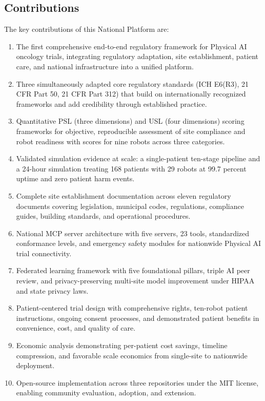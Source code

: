 \subsection{Contributions}
\label{subsec:contributions}

The key contributions of this National Platform are:

\begin{enumerate}[nosep]
  \item The first comprehensive end-to-end regulatory framework for Physical AI
    oncology trials, integrating regulatory adaptation, site establishment,
    patient care, and national infrastructure into a unified platform.
  \item Three simultaneously adapted core regulatory standards (ICH E6(R3),
    21 CFR Part 50, 21 CFR Part 312) that build on internationally recognized
    frameworks and add credibility through established practice.
  \item Quantitative PSL (three dimensions) and USL (four dimensions) scoring
    frameworks for objective, reproducible assessment of site compliance and
    robot readiness with scores for nine robots across three categories.
  \item Validated simulation evidence at scale: a single-patient ten-stage
    pipeline and a 24-hour simulation treating 168 patients with 29 robots at
    99.7 percent uptime and zero patient harm events.
  \item Complete site establishment documentation across eleven regulatory
    documents covering legislation, municipal codes, regulations, compliance
    guides, building standards, and operational procedures.
  \item National MCP server architecture with five servers, 23 tools,
    standardized conformance levels, and emergency safety modules for
    nationwide Physical AI trial connectivity.
  \item Federated learning framework with five foundational pillars, triple AI
    peer review, and privacy-preserving multi-site model improvement under
    HIPAA and state privacy laws.
  \item Patient-centered trial design with comprehensive rights, ten-robot
    patient instructions, ongoing consent processes, and demonstrated patient
    benefits in convenience, cost, and quality of care.
  \item Economic analysis demonstrating per-patient cost savings, timeline
    compression, and favorable scale economics from single-site to nationwide
    deployment.
  \item Open-source implementation across three repositories
    \cite{main-repo, mcp-repo, fl-repo} under the MIT license, enabling
    community evaluation, adoption, and extension.
\end{enumerate}

